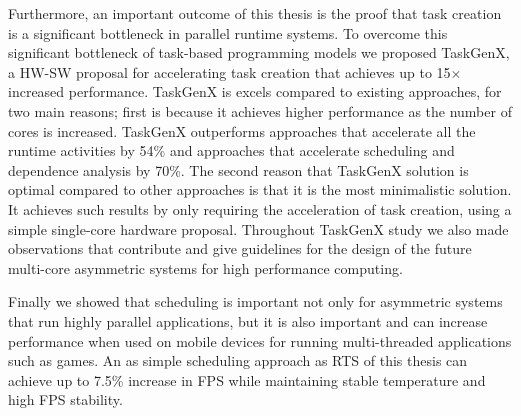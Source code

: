 	Furthermore, an important outcome of this thesis is the proof that task creation is a significant bottleneck in parallel runtime systems.
	To overcome this significant bottleneck of task-based programming models we proposed TaskGenX, a HW-SW proposal for accelerating task creation that achieves up to 15$\times$ increased performance.
	TaskGenX is excels compared to existing approaches, for two main reasons; first is because it achieves higher performance as the number of cores is increased. 
	TaskGenX outperforms approaches that accelerate all the runtime activities by 54\% and approaches that accelerate scheduling and dependence analysis  by 70\%.
	The second reason that TaskGenX solution is optimal compared to other approaches is that it is the most minimalistic solution. 
	It achieves such results by only requiring the acceleration of task creation, using a simple single-core hardware proposal.
	Throughout TaskGenX study we also made observations that contribute and give guidelines for the design of the future multi-core asymmetric systems for high performance computing.

	Finally we showed that scheduling is important not only for asymmetric systems that run highly parallel applications, but it is also important and can increase performance when used on mobile devices for running multi-threaded applications such as games.
	An as simple scheduling approach as RTS of this thesis can achieve up to 7.5\% increase in FPS while maintaining stable temperature and high FPS stability.





